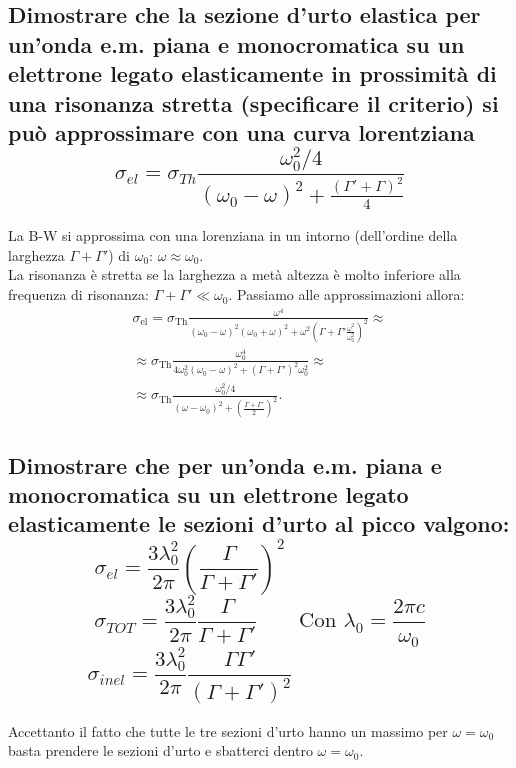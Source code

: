 \subsection[]{Dimostrare che la sezione d’urto elastica per un’onda e.m. piana e monocromatica su un elettrone legato elasticamente in prossimità di una risonanza stretta (specificare il criterio) si può approssimare con una curva lorentziana
\[
	\sigma_{el} = \sigma_{Th} \frac{\omega_{0}^2 / 4}{ \left( \omega_0 - \omega \right)^2 + \frac{ \left( \Gamma' + \Gamma  \right)^2 }{4} }
\] 
}
La B-W si approssima con una lorenziana in un intorno (dell'ordine della larghezza $\Gamma + \Gamma'$) di $\omega_0$: $\omega \approx \omega_0$.\\
La risonanza è stretta se la larghezza a metà altezza è molto inferiore alla frequenza di risonanza: $\Gamma + \Gamma' \ll \omega_0$.
Passiamo alle approssimazioni allora:
\begin{align*}
	\sigma_{\text{el}} = \sigma_{\text{Th}}\frac{\omega ^{4}}{\left( \omega _0 - \omega\right)^2 \left( \omega_0 + \omega \right)^2 + \omega^2\left( \Gamma + \Gamma' \frac{\omega^2}{\omega_0^2} \right)^2} \approx \\
	\approx \sigma_{\text{Th}} \frac{\omega _0^4}{4 \omega _0^2 \left( \omega _0 - \omega  \right)^2 + \left( \Gamma + \Gamma' \right)^2 \omega _0^2  } \approx \\
	\approx \sigma_{\text{Th}}\frac{\omega_0^2/4}{\left( \omega - \omega_0 \right)^2 + \left(\frac{\Gamma + \Gamma'}{2}\right)^2 }
.\end{align*}

\subsection[]{Dimostrare che per un’onda e.m. piana e monocromatica su un elettrone legato elasticamente le sezioni d'urto al picco valgono:
\[
	\sigma_{el} = \frac{3 \lambda_{0}^2}{2 \pi} \left( \frac{\Gamma}{\Gamma + \Gamma'} \right)^2 \quad \quad \quad \quad \quad \quad \text{ }
\]
\[
	\sigma_{TOT} = \frac{3 \lambda_{0}^2}{2 \pi} \frac{\Gamma}{\Gamma + \Gamma'} \quad \quad \text{Con $\lambda_{0} = \frac{2 \pi c}{\omega_{0}}$}
\]
\[
	\sigma_{inel} = \frac{3 \lambda_{0}^2}{2 \pi} \frac{\Gamma \Gamma'}{\left( \Gamma + \Gamma' \right)^2 } \quad \quad \quad \quad \quad \quad \text{ } 
\]
}
Accettanto il fatto che tutte le tre sezioni d'urto hanno un massimo per $\omega = \omega_0$ basta prendere le sezioni d'urto e sbatterci dentro $\omega = \omega_0$.

